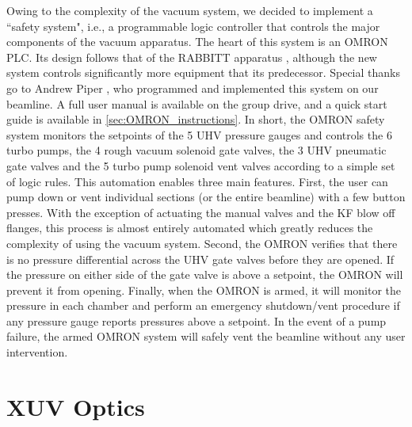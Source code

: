 Owing to the complexity of the vacuum system, we decided to implement a ``safety system", i.e., a programmable logic controller that controls the major components of the vacuum apparatus. The heart of this system is an OMRON PLC. Its design follows that of the RABBITT apparatus \cite{chirlaAttosecondPulseGeneration2011}, although the new system controls significantly more equipment that its predecessor. Special thanks go to Andrew Piper \cite{piperAndrewPiperDissertation2022}, who programmed and implemented this system on our beamline. A full user manual is available on the group drive, and a quick start guide is available in \cref{sec:OMRON_instructions}. In short, the OMRON safety system monitors the setpoints of the 5 UHV pressure gauges and controls the 6 turbo pumps, the 4 rough vacuum solenoid gate valves, the 3 UHV pneumatic gate valves and the 5 turbo pump solenoid vent valves according to a simple set of logic rules. This automation enables three main features. First, the user can pump down or vent individual sections (or the entire beamline) with a few button presses. With the exception of actuating the manual valves and the KF blow off flanges, this process is almost entirely automated which greatly reduces the complexity of using the vacuum system. Second, the OMRON verifies that there is no pressure differential across the UHV gate valves before they are opened. If the pressure on either side of the gate valve is above a setpoint, the OMRON will prevent it from opening. Finally, when the OMRON is armed, it will monitor the pressure in each chamber and perform an emergency shutdown/vent procedure if any pressure gauge reports pressures above a setpoint. In the event of a pump failure, the armed OMRON system will safely vent the beamline without any user intervention.

\section{XUV Optics}
\label{sec:Interferometer_Design}

